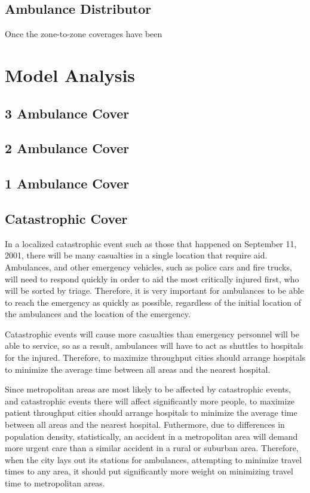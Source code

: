 \documentclass[notitlepage, 12pt]{article}
\begin{document}
\begin{enumerate}
\subsection{Ambulance Distributor}
Once the zone-to-zone coverages have been

\section{Model Analysis}

\subsection{3 Ambulance Cover}

\subsection{2 Ambulance Cover}

\subsection{1 Ambulance Cover}

\subsection{Catastrophic Cover}
In a localized catastrophic event such as those that happened on September 11, 2001, there will be
many casualties in a single location that require aid. Ambulances, and other emergency vehicles,
such as police cars and fire trucks, will need to respond quickly in order to aid the most critically
injured first, who will be sorted by triage. Therefore, it is very important for ambulances to be able to
reach the emergency as quickly as possible, regardless of the initial location of the ambulances and the
location of the emergency.

Catastrophic events will cause more casualties than emergency personnel will be able to service, so as a result,
ambulances will have to act as shuttles to hospitals for the injured. Therefore, to maximize throughput
cities should arrange hospitals to minimize the average time between all areas and the nearest
hospital.

Since metropolitan areas are most likely to be affected by catastrophic events, and catastrophic events there
will affect significantly more people, to maximize patient throughput cities should arrange hospitals to minimize
the average time between all areas and the nearest hospital. Futhermore, due to differences in population density,
statistically, an accident in a metropolitan area will demand more urgent care than a similar accident
in a rural or suburban area. Therefore, when the city lays out its stations for ambulances, attempting to minimize
travel times to any area, it should put significantly more weight on minimizing travel time to metropolitan areas.


\end{enumerate}
\end{document}
